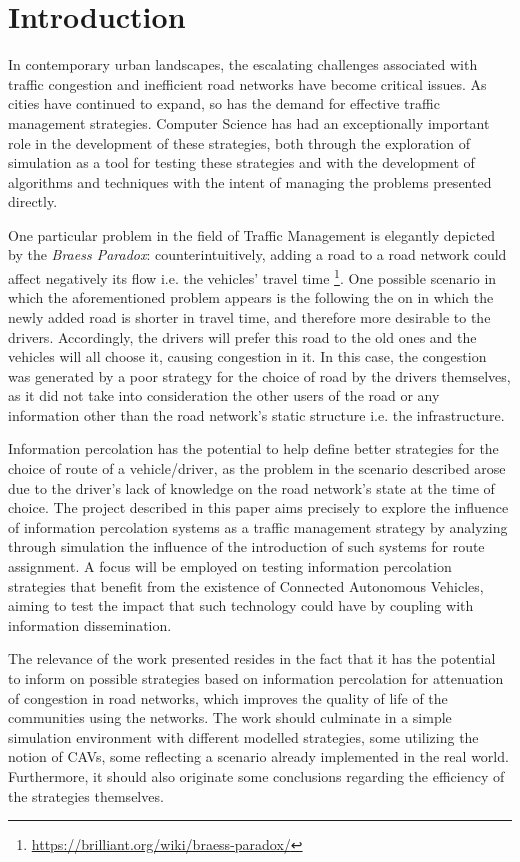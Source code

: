\section{Introduction}
\label{sec:Introduction}
 
In contemporary urban landscapes, the escalating challenges associated with traffic congestion and inefficient road networks have become critical issues. As cities have continued to expand, so has the demand for effective traffic management strategies. Computer Science has had an exceptionally important role in the development of these strategies, both through the exploration of simulation as a tool for testing these strategies and with the development of algorithms and techniques with the intent of managing the problems presented directly. 

One particular problem in the field of Traffic Management is elegantly depicted by the \textit{Braess Paradox}: counterintuitively, adding a road to a road network could affect negatively its flow i.e. the vehicles' travel time \footnote{\url{https://brilliant.org/wiki/braess-paradox/}}. One possible scenario in which the aforementioned problem appears is the following the on in which the newly added road is shorter in travel time, and therefore more desirable to the drivers. Accordingly, the drivers will prefer this road to the old ones and the vehicles will all choose it, causing congestion in it. In this case, the congestion was generated by a poor strategy for the choice of road by the drivers themselves, as it did not take into consideration the other users of the road or any information other than the road network's static structure i.e. the infrastructure. 

Information percolation has the potential to help define better strategies for the choice of route of a vehicle/driver, as the problem in the scenario described arose due to the driver's lack of knowledge on the road network's state at the time of choice. The project described in this paper aims precisely to explore the influence of information percolation systems as a traffic management strategy by analyzing through simulation the influence of the introduction of such systems for route assignment. A focus will be employed on testing information percolation strategies that benefit from the existence of Connected Autonomous Vehicles, aiming to test the impact that such technology could have by coupling with information dissemination.

The relevance of the work presented resides in the fact that it has the potential to inform on possible strategies based on information percolation for attenuation of congestion in road networks, which improves the quality of life of the communities using the networks. The work should culminate in a simple simulation environment with different modelled strategies, some utilizing the notion of CAVs, some reflecting a scenario already implemented in the real world. Furthermore, it should also originate some conclusions regarding the efficiency of the strategies themselves.

